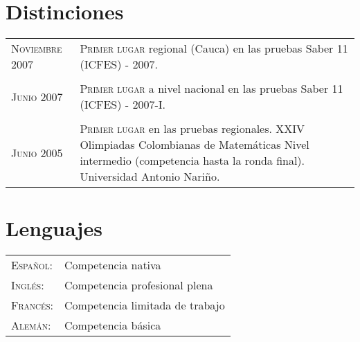 \documentclass[a4paper,10pt]{article} %
\begin{document}


\color{OrangeRed}
\section{Distinciones}
\color{black}

\begin{tabular}{p{2.8cm}p{11.9cm}}
\textsc{Noviembre 2007} & \textsc{Primer lugar} regional (Cauca) en las pruebas Saber 11 (ICFES) - 2007. \\ 
\\
\textsc{Junio 2007} & \textsc{Primer lugar} a nivel nacional en las pruebas Saber 11 (ICFES) - 2007-I. \\ 
\\
\textsc{Junio 2005} & \textsc{Primer lugar} en las pruebas regionales. XXIV Olimpiadas Colombianas de Matemáticas Nivel intermedio (competencia hasta la ronda final). Universidad Antonio Nariño.\\
\end{tabular}


\color{OrangeRed}
\section{Lenguajes}
\color{black}

\begin{tabular}{ll}
\textsc{Español:} & Competencia nativa \\
\textsc{Inglés:} & Competencia profesional plena \\
\textsc{Francés:} & Competencia limitada de trabajo \\
\textsc{Alemán:} & Competencia básica \\
\end{tabular}

\end{document}
